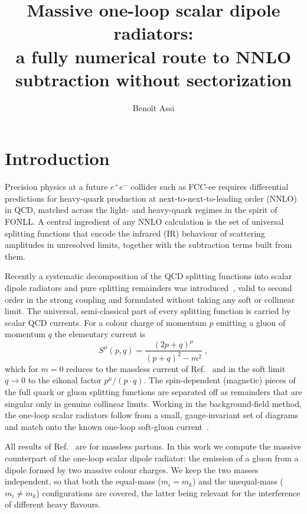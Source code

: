 \documentclass[11pt,a4paper]{article}
\title{\boldmath Massive one-loop scalar dipole radiators:\\
a fully numerical route to NNLO subtraction without sectorization}
\author{Benoît Assi}
\affiliation{...}
\begin{document}
\maketitle
\flushbottom

\section{Introduction}
\label{sec:intro}
Precision physics at a future $e^+e^-$ collider such as FCC-ee requires
differential predictions for heavy-quark production at next-to-next-to-leading
order (NNLO) in QCD, matched across the light- and heavy-quark regimes in the
spirit of FONLL. A central ingredient of any NNLO calculation is the set of
universal splitting functions that encode the infrared (IR) behaviour of
scattering amplitudes in unresolved limits, together with the subtraction terms
built from them.

Recently a systematic decomposition of the QCD splitting functions into
 {scalar dipole radiators} and  {pure splitting remainders} was
introduced~\cite{Campbell:2025}, valid to second order in the strong coupling and
formulated without taking any soft or collinear limit. The universal,
semi-classical part of every splitting function is carried by scalar QCD
currents. For a colour charge of momentum $p$ emitting a gluon of momentum $q$
the elementary current is
\begin{equation}
  S^{\mu}(p,q)=\frac{(2p+q)^{\mu}}{(p+q)^{2}-m^{2}}\;,
  \label{eq:scalarcurrent}
\end{equation}
which for $m=0$ reduces to the massless current of Ref.~\cite{Campbell:2025} and
in the soft limit $q\to0$ to the eikonal factor $p^\mu/(p\cdot q)$. The
spin-dependent (magnetic) pieces of the full quark or gluon splitting functions
are separated off as remainders that are singular only in genuine collinear
limits. Working in the background-field method, the one-loop scalar radiators
follow from a small, gauge-invariant set of diagrams and match onto the known
one-loop soft-gluon current~\cite{Catani:2000pi}.

All results of Ref.~\cite{Campbell:2025} are for massless partons. In this work
we compute the massive counterpart of the one-loop scalar dipole radiator: the
emission of a gluon from a dipole formed by two massive colour charges. We keep
the two masses independent, so that both the equal-mass ($m_i=m_k$) and the
unequal-mass ($m_i\neq m_k$) configurations are covered, the latter being
relevant for the interference of different heavy flavours.
\end{document}
